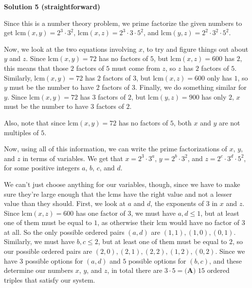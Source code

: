 \begin{enumerate}
 



\textbf{Solution 5 (straightforward)}

Since this is a number theory problem, we prime factorize the given numbers to get $\text{lcm}(x,y) = 2^3 \cdot 3^2$, $\text{lcm}(x,z) = 2^3 \cdot 3 \cdot 5^2$, and $\text{lcm}(y,z) = 2^2 \cdot 3^2 \cdot 5^2$.

 Now, we look at the two equations involving $x$, to try and figure things out about $y$ and $z$. Since $\text{lcm}(x,y) = 72$ has no factors of $5$, but $\text{lcm}(x,z) = 600$ has $2$, this means that those $2$ factors of $5$ must come from $z$, so $z$ has $2$ factors of $5$. Similarly, $\text{lcm}(x,y) = 72$ has $2$ factors of $3$, but $\text{lcm}(x,z) = 600$ only has $1$, so $y$ must be the number to have $2$ factors of $3$. Finally, we do something similar for $y$. Since $\text{lcm}(x,y) = 72$ has $3$ factors of $2$, but $\text{lcm}(y,z) = 900$ has only $2$, $x$ must be the number to have $3$ factors of $2$.

 Also, note that since $\text{lcm}(x,y) = 72$ has no factors of $5$, both $x$ and $y$ are not multiples of $5$.

 Now, using all of this information, we can write the prime factorizations of $x$, $y$, and $z$ in terms of variables. We get that $x = 2^3 \cdot 3^a$, $y = 2^b \cdot 3^2$, and $z = 2^c \cdot 3^d \cdot 5^2$, for some positive integers $a$, $b$, $c$, and $d$.

 We can't just choose anything for our variables, though, since we have to make sure they're large enough that the lcms have the right value and not a lesser value than they should. First, we look at $a$ and $d$, the exponents of 3 in $x$ and $z$. Since $\text{lcm}(x,z) = 600$ has one factor of $3$, we must have $a, d \leq 1$, but at least one of them must be equal to $1$, as otherwise their lcm would have no factor of $3$ at all. So the only possible ordered pairs $(a, d)$ are $(1, 1), (1, 0), (0, 1)$. Similarly, we must have $b, c \leq 2$, but at least one of them must be equal to $2$, so our possible ordered pairs are $(2, 0), (2, 1), (2, 2), (1, 2), (0, 2)$. Since we have $3$ possible options for $(a, d)$ and $5$ possible options for $(b, c)$, and these determine our numbers $x$, $y$, and $z$, in total there are $3 \cdot 5 = \boxed{\textbf{(A) }15}$ ordered triples that satisfy our system.

 


\end{enumerate}
